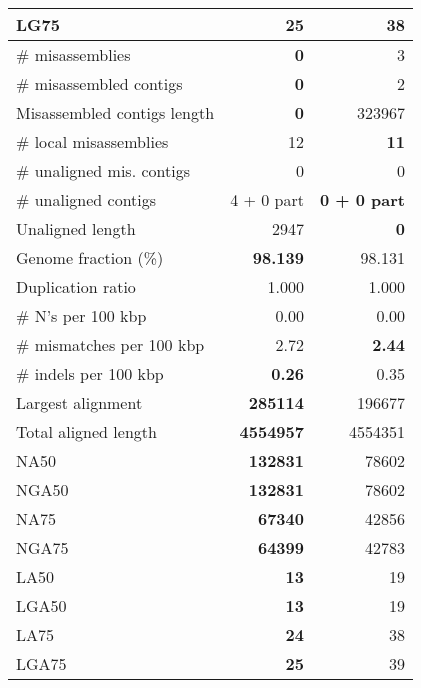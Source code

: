 \documentclass[12pt,a4paper]{article}
\begin{document}
\begin{table}[ht]
\begin{center}
\begin{tabular}{|l*{2}{|r}|}
LG75 & {\bf 25} & 38 \\ \hline
\# misassemblies & {\bf 0} & 3 \\ \hline
\# misassembled contigs & {\bf 0} & 2 \\ \hline
Misassembled contigs length & {\bf 0} & 323967 \\ \hline
\# local misassemblies & 12 & {\bf 11} \\ \hline
\# unaligned mis. contigs & 0 & 0 \\ \hline
\# unaligned contigs & 4 + 0 part & {\bf 0 + 0 part} \\ \hline
Unaligned length & 2947 & {\bf 0} \\ \hline
Genome fraction (\%) & {\bf 98.139} & 98.131 \\ \hline
Duplication ratio & 1.000 & 1.000 \\ \hline
\# N's per 100 kbp & 0.00 & 0.00 \\ \hline
\# mismatches per 100 kbp & 2.72 & {\bf 2.44} \\ \hline
\# indels per 100 kbp & {\bf 0.26} & 0.35 \\ \hline
Largest alignment & {\bf 285114} & 196677 \\ \hline
Total aligned length & {\bf 4554957} & 4554351 \\ \hline
NA50 & {\bf 132831} & 78602 \\ \hline
NGA50 & {\bf 132831} & 78602 \\ \hline
NA75 & {\bf 67340} & 42856 \\ \hline
NGA75 & {\bf 64399} & 42783 \\ \hline
LA50 & {\bf 13} & 19 \\ \hline
LGA50 & {\bf 13} & 19 \\ \hline
LA75 & {\bf 24} & 38 \\ \hline
LGA75 & {\bf 25} & 39 \\ \hline
\end{tabular}
\end{center}
\end{table}
\end{document}
